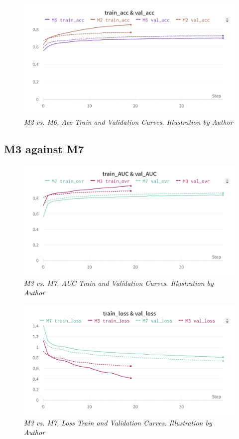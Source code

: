 \begin{figure}[H]
  \centering
  \includegraphics[width=\textwidth]{imatges/results/AccM2M6.png}
  \caption[M2 vs. M6, Acc Train and Validation Curves]{\textit{M2 vs. M6, Acc Train and Validation Curves. Illustration by Author}}
\end{figure}

\newpage

\subsection{M3 against M7}

\begin{figure}[H]
  \centering
  \includegraphics[width=\textwidth]{imatges/results/AUCM3M7.png}
  \caption[M3 vs. M7, AUC Train and Validation Curves]{\textit{M3 vs. M7, AUC Train and Validation Curves. Illustration by Author}}
\end{figure}


\begin{figure}[H]
  \centering
  \includegraphics[width=\textwidth]{imatges/results/LossM3M7.png}
  \caption[M3 vs. M7, Loss Train and Validation Curves]{\textit{M3 vs. M7, Loss Train and Validation Curves. Illustration by Author}}
\end{figure}

